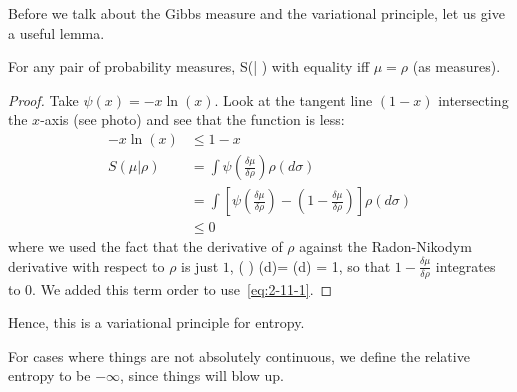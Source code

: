 \documentclass[12pt]{book}
\theoremstyle{norm}
\begin{document}
Before we talk about the Gibbs measure and the variational principle, let us give a useful lemma.

\begin{lemma} For any pair of probability measures, %
\be
S(\mu | \rho) 
\ee
with equality iff $\mu = \rho$ (as measures).
\end{lemma}
\begin{proof}
Take $\psi(x) = -x\ln(x)$. Look at the tangent line $(1 - x)$ intersecting the $x$-axis (see photo) and see that the function is less: 
\begin{align}
-x \ln(x) &\leq 1 - x
\label{eq:2-11-1}
\\
\nonumber
S(\mu | \rho) &= 
\int  \psi\left( {\frac{\delta\mu}{\delta\rho}} \right) \rho(d\sigma)\\
\nonumber
&=\int \left[ \psi\left( {\frac{\delta\mu}{\delta\rho}} \right) - \left( {1 - \frac{\delta\mu}{\delta\rho}} \right)\right]\rho(d\sigma)\\
\nonumber &\leq 0
\end{align}
where we used the fact that the derivative of $\rho$ against the Radon-Nikodym derivative with respect to $\rho$ is just $1$, \be\int \left(\frac{\delta \mu}{\delta \rho} \right) \rho (d\sigma )= \int \mu (d\sigma) = 1,\ee 
so that $1-\frac{\delta\mu}{\delta\rho}$ integrates to $0$. We added this term order to use~\eqref{eq:2-11-1}. 
\end{proof}
Hence, this is a variational principle for entropy. 

\begin{remark}
For cases where things are not absolutely continuous, we define the relative entropy to be $-\infty$, since things will blow up. 
\end{remark}
\end{document}
